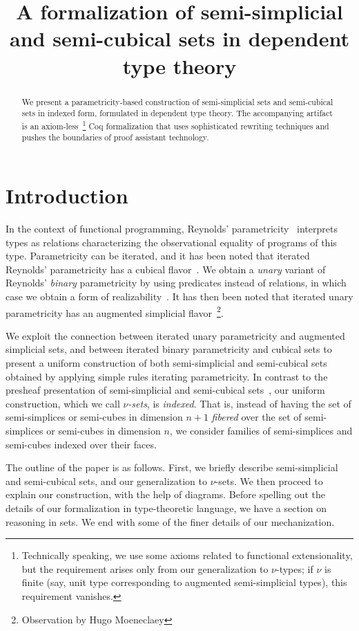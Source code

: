 \documentclass[10pt]{art.cls/art}
\title{A formalization of semi-simplicial and semi-cubical sets in dependent type theory}
\author{\IEEEauthorblockN{Hugo Herbelin \\ and Ramkumar Ramachandra} \IEEEauthorblockA{Université Paris Cité, Inria, CNRS, IRIF, Paris}}
\begin{document}
\maketitle
\begin{abstract}
  We present a parametricity-based construction of semi-simplicial sets and semi-cubical sets in indexed form, formulated in dependent type theory. The accompanying artifact is an axiom-less~\footnote{Technically speaking, we use some axioms related to functional extensionality, but the requirement arises only from our generalization to $\nu$-types; if $\nu$ is finite (say, unit type corresponding to augmented semi-simplicial types), this requirement vanishes.} Coq formalization that uses sophisticated rewriting techniques and pushes the boundaries of proof assistant technology.
\end{abstract}

\section{Introduction}
In the context of functional programming, Reynolds' parametricity~\cite{reynolds72} interprets types as relations characterizing the observational equality of programs of this type. Parametricity can be iterated, and it has been noted that iterated Reynolds' parametricity has a cubical flavor~\cite{johann17,altenkirch15,moulin16}. We obtain a \emph{unary} variant of Reynolds' \emph{binary} parametricity by using predicates instead of relations, in which case we obtain a form of realizability~\cite{bernardy12,moulin16}. It has then been noted that iterated unary parametricity has an augmented simplicial flavor~\footnote{Observation by Hugo Moeneclaey}.

We exploit the connection between iterated unary parametricity and augmented simplicial sets, and between iterated binary parametricity and cubical sets to present a uniform construction of both semi-simplicial and semi-cubical sets obtained by applying simple rules iterating parametricity. In contrast to the presheaf presentation of semi-simplicial and semi-cubical sets~\cite{cchm}, our uniform construction, which we call \emph{$\nu$-sets}, is \emph{indexed}. That is, instead of having the set of semi-simplices or semi-cubes in dimension $n+1$
\emph{fibered} over the set of semi-simplices or semi-cubes in dimension $n$, we consider families of semi-simplices and semi-cubes indexed over their faces.

The outline of the paper is as follows. First, we briefly describe semi-simplicial and semi-cubical sets, and our generalization to $\nu$-sets. We then proceed to explain our construction, with the help of diagrams. Before spelling out the details of our formalization in type-theoretic language, we have a section on reasoning in sets. We end with some of the finer details of our mechanization.
\end{document}
